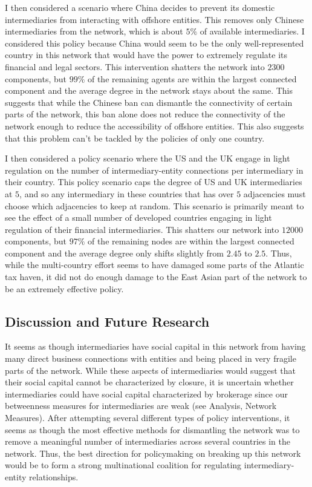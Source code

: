 \documentclass[11pt]{article}
\begin{document}
I then considered a scenario where China decides to prevent its domestic
intermediaries from interacting with offshore entities. This removes only
Chinese intermediaries from the network, which is about $5\%$ of available
intermediaries. I considered this policy because China would seem to be the
only well-represented country in this network that would have the power to
extremely regulate its financial and legal sectors.
This intervention shatters the network into $2300$ components, but $99\%$ of
the remaining agents are within the largest connected component and the average
degree in the network stays about the same. This suggests that while the
Chinese ban can dismantle the connectivity of certain parts of the network,
this ban alone does not reduce the connectivity of the network enough to reduce
the accessibility of offshore entities. This also suggests that this problem
can't be tackled by the policies of only one country.

I then considered a policy scenario where the US and the UK engage in light
regulation on the number of intermediary-entity connections per intermediary
in their country. This policy scenario caps the degree of US and UK
intermediaries at $5$, and so any intermediary in these countries that has over
$5$ adjacencies must choose which adjacencies to keep at random. This scenario
is primarily meant to see the effect of a small number of developed countries
engaging in light regulation of their financial intermediaries. This shatters
our network into $12000$ components, but $97\%$ of the remaining nodes are
within the largest connected component and the average degree only shifts
slightly from $2.45$ to $2.5$. Thus, while the multi-country effort seems to 
have damaged some parts of the Atlantic tax haven, it did not do enough
damage to the East Asian part of the network to be an extremely effective
policy.

\subsection{Discussion and Future Research}

It seems as though intermediaries have social capital in this network from
having many direct business connections with entities and being placed in very
fragile parts of the network. While these aspects of intermediaries
would suggest that their social capital cannot be characterized by closure, it
is uncertain whether intermediaries could have social capital characterized
by brokerage since our betweenness measures for intermediaries are weak (see
Analysis, Network Measures). After attempting several different types of
policy interventions, it seems as though the most effective methods for
dismantling the network was to remove a meaningful number of intermediaries
across several countries in the network. Thus, the best direction for 
policymaking on breaking up this network would be to form a strong 
multinational coalition for regulating intermediary-entity relationships.
\end{document}
